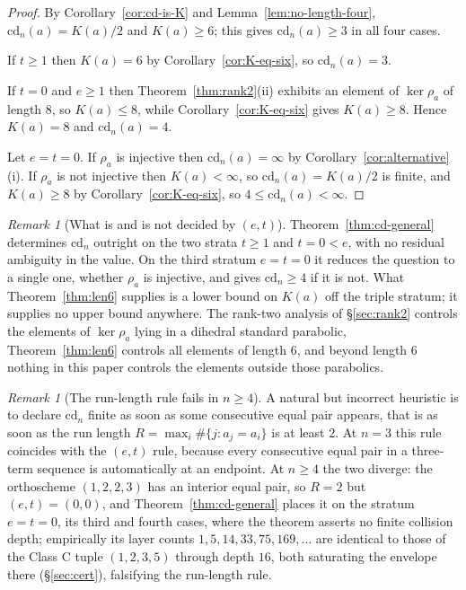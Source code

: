 \documentclass[11pt,a4paper]{article}
\newcommand{\cd}{\mathrm{cd}}
\theoremstyle{definition}
\theoremstyle{remark}
\newtheorem{remark}[theorem]{Remark}
\theoremstyle{plain}
\begin{document}
\begin{proof}
By Corollary~\ref{cor:cd-is-K} and Lemma~\ref{lem:no-length-four}, $\cd_n(a)=K(a)/2$ and
$K(a)\ge6$; this gives $\cd_n(a)\ge3$ in all four cases.

If $t\ge1$ then $K(a)=6$ by Corollary~\ref{cor:K-eq-six}, so $\cd_n(a)=3$.

If $t=0$ and $e\ge1$ then Theorem~\ref{thm:rank2}(ii) exhibits an element of $\ker\rho_a$ of
length $8$, so $K(a)\le8$, while Corollary~\ref{cor:K-eq-six} gives $K(a)\ge8$. Hence $K(a)=8$
and $\cd_n(a)=4$.

Let $e=t=0$. If $\rho_a$ is injective then $\cd_n(a)=\infty$ by
Corollary~\ref{cor:alternative}(i). If $\rho_a$ is not injective then $K(a)<\infty$, so
$\cd_n(a)=K(a)/2$ is finite, and $K(a)\ge8$ by Corollary~\ref{cor:K-eq-six}, so
$4\le\cd_n(a)<\infty$.
\end{proof}

\begin{remark}[What is and is not decided by $(e,t)$]\label{rem:second-case}
Theorem~\ref{thm:cd-general} determines $\cd_n$ outright on the two strata $t\ge1$ and
$t=0<e$, with no residual ambiguity in the value. On the third stratum $e=t=0$ it reduces the
question to a single one, whether $\rho_a$ is injective, and gives $\cd_n\ge4$ if it is not.
What Theorem~\ref{thm:len6} supplies is a lower bound on $K(a)$ off the triple stratum; it
supplies no upper bound anywhere. The rank-two analysis of \S\ref{sec:rank2} controls the
elements of $\ker\rho_a$ lying in a dihedral standard parabolic, Theorem~\ref{thm:len6}
controls all elements of length $6$, and beyond length $6$ nothing in this paper controls the
elements outside those parabolics.
\end{remark}

\begin{remark}[The run-length rule fails in $n\ge4$]\label{rem:R-rule}
A natural but incorrect heuristic is to declare $\cd_n$ finite as soon as some consecutive equal
pair appears, that is as soon as the run length $R=\max_i\#\{j:a_j=a_i\}$ is at least $2$. At
$n=3$ this rule coincides with the $(e,t)$ rule, because every consecutive equal pair in a
three-term sequence is automatically at an endpoint. At $n\ge4$ the two diverge: the orthoscheme
$(1,2,2,3)$ has an interior equal pair, so $R=2$ but $(e,t)=(0,0)$, and
Theorem~\ref{thm:cd-general} places it on the stratum $e=t=0$, its third and fourth cases,
where the theorem asserts no finite collision depth; empirically its layer counts
$1,5,14,33,75,169,\dots$ are identical to those of the Class C tuple $(1,2,3,5)$ through depth
$16$, both saturating the envelope there (\S\ref{sec:cert}), falsifying the run-length rule.
\end{remark}
\end{document}
